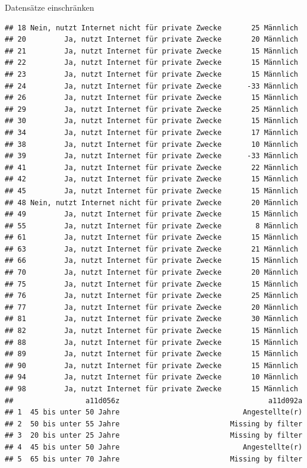 \documentclass[ignorenonframetext,]{beamer}
\begin{document}
\begin{frame}[fragile]{Datensätze einschränken}
\begin{verbatim}
## 18 Nein, nutzt Internet nicht für private Zwecke       25 Männlich
## 20         Ja, nutzt Internet für private Zwecke       20 Männlich
## 21         Ja, nutzt Internet für private Zwecke       15 Männlich
## 22         Ja, nutzt Internet für private Zwecke       15 Männlich
## 23         Ja, nutzt Internet für private Zwecke       15 Männlich
## 24         Ja, nutzt Internet für private Zwecke      -33 Männlich
## 26         Ja, nutzt Internet für private Zwecke       15 Männlich
## 29         Ja, nutzt Internet für private Zwecke       25 Männlich
## 30         Ja, nutzt Internet für private Zwecke       15 Männlich
## 34         Ja, nutzt Internet für private Zwecke       17 Männlich
## 38         Ja, nutzt Internet für private Zwecke       10 Männlich
## 39         Ja, nutzt Internet für private Zwecke      -33 Männlich
## 41         Ja, nutzt Internet für private Zwecke       22 Männlich
## 42         Ja, nutzt Internet für private Zwecke       15 Männlich
## 45         Ja, nutzt Internet für private Zwecke       15 Männlich
## 48 Nein, nutzt Internet nicht für private Zwecke       20 Männlich
## 49         Ja, nutzt Internet für private Zwecke       15 Männlich
## 55         Ja, nutzt Internet für private Zwecke        8 Männlich
## 61         Ja, nutzt Internet für private Zwecke       15 Männlich
## 63         Ja, nutzt Internet für private Zwecke       21 Männlich
## 66         Ja, nutzt Internet für private Zwecke       15 Männlich
## 70         Ja, nutzt Internet für private Zwecke       20 Männlich
## 75         Ja, nutzt Internet für private Zwecke       15 Männlich
## 76         Ja, nutzt Internet für private Zwecke       25 Männlich
## 77         Ja, nutzt Internet für private Zwecke       20 Männlich
## 81         Ja, nutzt Internet für private Zwecke       30 Männlich
## 82         Ja, nutzt Internet für private Zwecke       15 Männlich
## 88         Ja, nutzt Internet für private Zwecke       15 Männlich
## 89         Ja, nutzt Internet für private Zwecke       15 Männlich
## 90         Ja, nutzt Internet für private Zwecke       15 Männlich
## 94         Ja, nutzt Internet für private Zwecke       10 Männlich
## 98         Ja, nutzt Internet für private Zwecke       15 Männlich
##                 a11d056z                                   a11d092a
## 1  45 bis unter 50 Jahre                             Angestellte(r)
## 2  50 bis unter 55 Jahre                          Missing by filter
## 3  20 bis unter 25 Jahre                          Missing by filter
## 4  45 bis unter 50 Jahre                             Angestellte(r)
## 5  65 bis unter 70 Jahre                          Missing by filter

\end{verbatim}
\end{frame}
\end{document}
